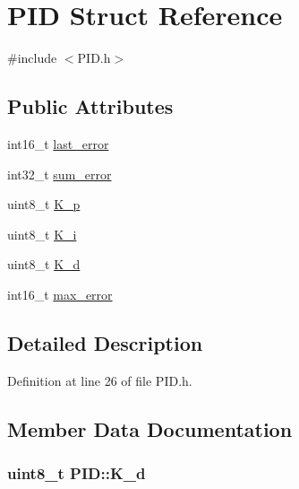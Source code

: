 \hypertarget{struct_p_i_d}{}\section{P\+ID Struct Reference}
\label{struct_p_i_d}


{\ttfamily \#include $<$P\+I\+D.\+h$>$}

\subsection*{Public Attributes}
\begin{DoxyCompactItemize}
\item 
int16\+\_\+t \hyperlink{struct_p_i_d_a242dbdb4ae8fe619dd26651e9e538a6a}{last\+\_\+error}
\item 
int32\+\_\+t \hyperlink{struct_p_i_d_aa78b06ddfb1b124f415a0ea84e831935}{sum\+\_\+error}
\item 
uint8\+\_\+t \hyperlink{struct_p_i_d_a394199480a053023b60037ec30b3d5fd}{K\+\_\+p}
\item 
uint8\+\_\+t \hyperlink{struct_p_i_d_a598391a8fd61e53bc87b684e0bba712f}{K\+\_\+i}
\item 
uint8\+\_\+t \hyperlink{struct_p_i_d_aaa82d4d2d3b7a169ebbedfc9cf7dea71}{K\+\_\+d}
\item 
int16\+\_\+t \hyperlink{struct_p_i_d_a99bc0d7835e0e95a7aaca1b4b52c1080}{max\+\_\+error}
\end{DoxyCompactItemize}


\subsection{Detailed Description}


Definition at line 26 of file P\+I\+D.\+h.



\subsection{Member Data Documentation}
\subsubsection[{\texorpdfstring{K\+\_\+d}{K_d}}]{\setlength{\rightskip}{0pt plus 5cm}uint8\+\_\+t P\+I\+D\+::\+K\+\_\+d}\hypertarget{struct_p_i_d_aaa82d4d2d3b7a169ebbedfc9cf7dea71}{}\label{struct_p_i_d_aaa82d4d2d3b7a169ebbedfc9cf7dea71}


